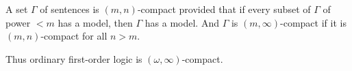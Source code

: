 A set $\Gamma$ of sentences is $(m, n)$-compact provided that if every subset of $\Gamma$ of power $< m$ has a model, then $\Gamma$ has a model. And $\Gamma$ is $(m, \infty)$-compact if it is $(m, n)$-compact for all $n > m$.

Thus ordinary first-order logic is $(\omega, \infty)$-compact.
